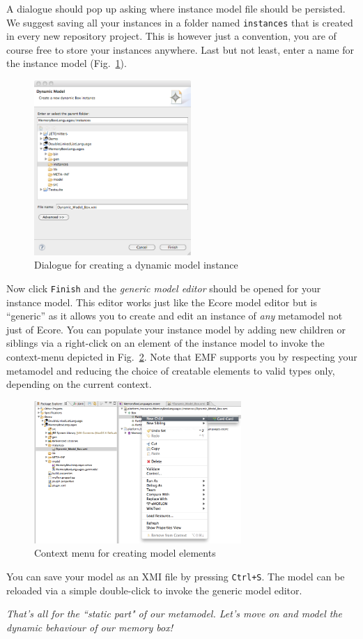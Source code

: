 A dialogue should pop up asking where instance model file should be persisted.
We suggest saving all your instances in a folder named \texttt{instances} that
is created in every new repository project.
This is however just a convention, you are of course free to store your
instances anywhere.
Last but not least, enter a name for the instance model
(Fig.~\ref{fig:store_dynamic_instance}). 

\begin{figure}[htbp]
	\centering 
  \includegraphics[width=0.53\textwidth]{pics/modelBrowserBilder/persistDialog.png} 
	\caption{Dialogue for creating a dynamic model instance}
	\label{fig:store_dynamic_instance}
\end{figure}
 
Now click \texttt{Finish} and the \emph{generic model editor} should be opened
for your instance model. 
This editor works just like the Ecore model editor but is ``generic'' as it
allows you to create and edit an instance of \emph{any} metamodel not just of
Ecore.
You can populate your instance model by adding new children or siblings via a
right-click on an element of the instance model to invoke the context-menu
depicted in Fig.~\ref{fig:create_instance}.
Note that EMF supports you by respecting your metamodel and reducing the choice
of creatable elements to valid types only, depending on the current context. 

\begin{figure}[htbp]
	\centering 
  \includegraphics[width=0.7\textwidth]{pics/modelBrowserBilder/adjustModel.png} 
	\caption{Context menu for creating model elements}
	\label{fig:create_instance}
\end{figure}

You can save your model as an XMI file by pressing \texttt{Ctrl+S}.
The model can be reloaded via a simple double-click to invoke the generic model
editor. 

\textsl{That's all for the ``static part" of our metamodel. Let's move on and
model the dynamic behaviour of our memory box!}
